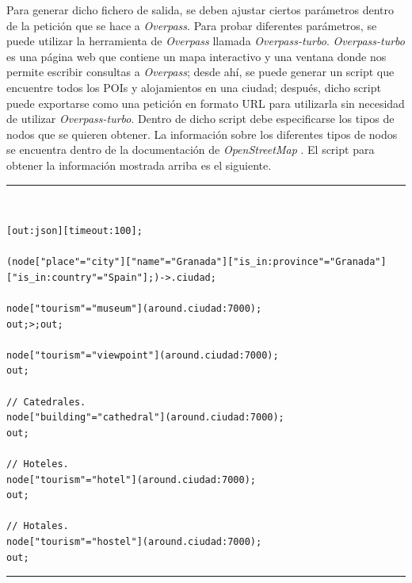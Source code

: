 Para generar dicho fichero de salida, se deben ajustar ciertos parámetros dentro de la petición que se hace a \textit{Overpass}. Para probar diferentes parámetros, se puede utilizar la herramienta de \textit{Overpass} llamada \textit{Overpass-turbo}.\newline
\textit{Overpass-turbo} es una página web que contiene un mapa interactivo y una ventana donde nos permite escribir consultas a \textit{Overpass}; desde ahí, se puede generar un script que encuentre todos los POIs y alojamientos en una ciudad; después, dicho script puede exportarse como una petición en formato URL para utilizarla sin necesidad de utilizar \textit{Overpass-turbo}. Dentro de dicho script debe especificarse los tipos de nodos que se quieren obtener. La información sobre los diferentes tipos de nodos se encuentra dentro de la documentación de \textit{OpenStreetMap} \cite{openstreetmap_doc}. El script para obtener la información mostrada arriba es el siguiente. \newline
\noindent\rule[-1ex]{\textwidth}{1pt}\\
\begin{lstlisting}[caption=Script para encontrar todos los POIs y alojamientos de una ciudad.]
[out:json][timeout:100]; 

(node["place"="city"]["name"="Granada"]["is_in:province"="Granada"]
["is_in:country"="Spain"];)->.ciudad; 

node["tourism"="museum"](around.ciudad:7000);
out;>;out;

node["tourism"="viewpoint"](around.ciudad:7000);
out;

// Catedrales.
node["building"="cathedral"](around.ciudad:7000);
out;

// Hoteles.
node["tourism"="hotel"](around.ciudad:7000);
out;

// Hotales.
node["tourism"="hostel"](around.ciudad:7000);
out;
\end{lstlisting}
\noindent\rule[-1ex]{\textwidth}{1pt}\\
